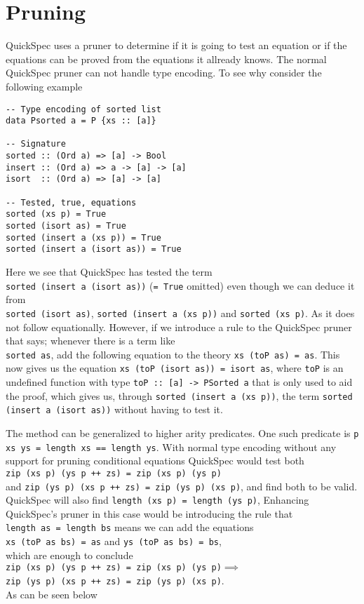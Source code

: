 \section{Pruning}
QuickSpec uses a pruner to determine if
it is going to test an equation or if the equations
can be proved from the equations it allready knows.
The normal QuickSpec pruner can not handle type encoding.
To see why consider the following example
\begin{verbatim}
-- Type encoding of sorted list
data Psorted a = P {xs :: [a]}

-- Signature
sorted :: (Ord a) => [a] -> Bool
insert :: (Ord a) => a -> [a] -> [a]
isort  :: (Ord a) => [a] -> [a]

-- Tested, true, equations
sorted (xs p) = True
sorted (isort as) = True
sorted (insert a (xs p)) = True
sorted (insert a (isort as)) = True
\end{verbatim}
Here we see that QuickSpec has tested the term
\\\texttt{sorted (insert a (isort as))} (\texttt{= True} omitted)
even though we can deduce it from
\\\texttt{sorted (isort as)},
\texttt{sorted (insert a (xs p))} and
\texttt{sorted (xs p)}. As it does not follow
equationally. However, if we introduce
a rule to the QuickSpec pruner that says;
whenever there is a term like \\\texttt{sorted as},
add the following equation to the theory
\texttt{xs (toP as) = as}. This now gives us
the equation \texttt{xs (toP (isort as)) = isort as},
where \texttt{toP} is an undefined function with type
\texttt{toP :: [a] -> PSorted a} that is only used to aid the proof,
which gives us, through \texttt{sorted (insert a (xs p))},
the term \texttt{sorted (insert a (isort as))} without
having to test it.

The method can be generalized to higher arity predicates.
One such predicate is \texttt{p xs ys = length xs == length ys}.
With normal type encoding without any support for pruning
conditional equations QuickSpec would test both
\\\texttt{zip (xs p) (ys p ++ zs) = zip (xs p) (ys p)}\\
and \texttt{zip (ys p) (xs p ++ zs) = zip (ys p) (xs p)}, and find
both to be valid.
QuickSpec will also find \texttt{length (xs p) = length (ys p)},
Enhancing QuickSpec's pruner in this case would be introducing
the rule that\\\texttt{length as = length bs} means we can add the equations
\\\texttt{xs (toP as bs) = as} and \texttt{ys (toP as bs) = bs},\\
which are enough to conclude\\
\texttt{zip (xs p) (ys p ++ zs) = zip (xs p) (ys p)}$\implies$
\\\texttt{zip (ys p) (xs p ++ zs) = zip (ys p) (xs p)}.\\As can be
seen below


